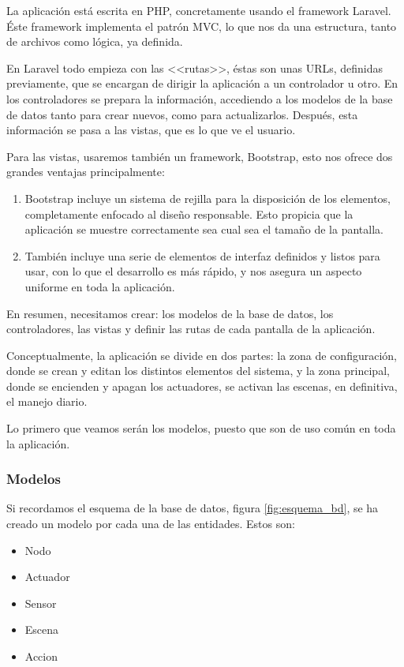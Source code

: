   La aplicación está escrita en PHP, concretamente usando el framework Laravel. Éste framework implementa el patrón MVC, lo que nos da una estructura, tanto de archivos como lógica, ya definida.
  
  En Laravel todo empieza con las <<rutas>>, éstas son unas URLs, definidas previamente, que se encargan de dirigir la aplicación a un controlador u otro. En los controladores se prepara la información, accediendo a los modelos de la base de datos tanto para crear nuevos, como para actualizarlos. Después, esta información se pasa a las vistas, que es lo que ve el usuario.
  
  Para las vistas, usaremos también un framework, Bootstrap, esto nos ofrece dos grandes ventajas principalmente:
  \begin{enumerate}
      \item Bootstrap incluye un sistema de rejilla para la disposición de los elementos, completamente enfocado al diseño responsable. Esto propicia que la aplicación se muestre correctamente sea cual sea el tamaño de la pantalla.
      \item También incluye una serie de elementos de interfaz definidos y listos para usar, con lo que el desarrollo es más rápido, y nos asegura un aspecto uniforme en toda la aplicación.
    \end{enumerate}
    
 En resumen, necesitamos crear: los modelos de la base de datos,  los controladores, las vistas y definir las rutas de cada pantalla de la aplicación.
 
 Conceptualmente, la aplicación se divide en dos partes: la zona de configuración, donde se crean y editan los distintos elementos del sistema, y la zona principal, donde se encienden y apagan los actuadores, se activan las escenas, en definitiva, el manejo diario.
 
 Lo primero que veamos serán los modelos, puesto que son de uso común en toda la aplicación.
 
 
 \subsubsection{Modelos}
 
 Si recordamos el esquema de la base de datos, figura \ref{fig:esquema_bd}, se ha creado un modelo por cada una de las entidades. Estos son:
 \begin{itemize}
     \item Nodo
     \item Actuador
     \item Sensor
     \item Escena
     \item Accion
    \end{itemize}
    
